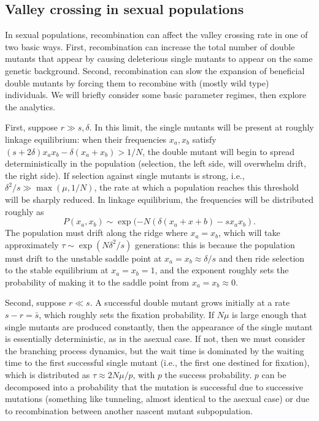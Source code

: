 \documentclass[10pt]{revtex4}
\begin{document}
\subsection{Valley crossing in sexual populations}

In sexual populations, recombination can affect the valley crossing rate in one of two basic ways.
First, recombination can increase the total number of double mutants that appear by causing deleterious single mutants to appear on the same genetic background.
Second, recombination can slow the expansion of beneficial double mutants by forcing them to recombine with (mostly wild type) individuals.
We will briefly consider some basic parameter regimes, then explore the analytics.

First, suppose $r \gg s, \delta$.
In this limit, the single mutants will be present at roughly linkage equilibrium: when their frequencies $x_a, x_b$ satisfy $(s+2\delta)x_ax_b - \delta(x_a+x_b) > 1/N$, the double mutant will begin to spread deterministically in the population (selection, the left side, will overwhelm drift, the right side).
If selection against single mutants is strong, i.e., $\delta^2/s \gg \max (\mu, 1/N)$, the rate at which a population reaches this threshold will be sharply reduced.
In linkage equilibrium, the frequencies will be distributed roughly as
\begin{equation}
P(x_a,x_b) \sim \exp(-N(\delta(x_a+x+b) - sx_ax_b).
\end{equation}
The population must drift along the ridge where $x_a = x_b$, which will take approximately $\tau \sim \exp(N\delta^2/s)$ generations: this is because the population must drift to the unstable saddle point at $x_a = x_b \approx \delta/s$ and then ride selection to the stable equilibrium at $x_a = x_b = 1$, and the exponent roughly sets the probability of making it to the saddle point from $x_a = x_b \approx 0$.

Second, suppose $r \ll s$.
A successful double mutant grows initially at a rate $s - r = \bar{s}$, which roughly sets the fixation probability.
If $N\mu$ is large enough that single mutants are produced constantly, then the appearance of the single mutant is essentially deterministic, as in the asexual case.
If not, then we must consider the branching process dynamics, but the wait time is dominated by the waiting time to the first successful single mutant (i.e., the first one destined for fixation), which is distributed as $\tau \approx 2N\mu/p$, with $p$ the success probability.
$p$ can be decomposed into a probability that the mutation is successful due to successive mutations (something like tunneling, almost identical to the asexual case) or due to recombination between another nascent mutant subpopulation.
\end{document}
